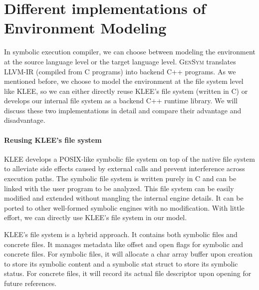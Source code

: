 \documentclass[sigplan, nonacm]{acmart}\settopmatter{printfolios=true,printccs=false,printacmref=false}
\newcommand{\tool}{\textsc{GenSym}\xspace}
\begin{document}
\section{Different implementations of Environment Modeling}\label{twofsimpl}
In symbolic execution compiler, we can choose between modeling the environment at the source language level or the target language level. \tool translates LLVM-IR (compiled from C programs) into backend C++ programs. As we mentioned before, we choose to model the environment at the file system level like KLEE, so we can either directly reuse KLEE's file system (written in C) or develops our internal file system as a backend C++ runtime library. We will discuss these two implementations in detail and compare their advantage and disadvantage.
\paragraph*{Reusing KLEE's file system}
KLEE develops a POSIX-like symbolic file system on top of the native file system to alleviate side effects caused by external calls and prevent interference across execution paths. The symbolic file system is written purely in C and can be linked with the user program to be analyzed. This file system can be easily modified and extended without mangling
 the internal engine details. It can be ported to other well-formed symbolic engines with no modification. With little effort, we can directly use KLEE's file system in our model.\par
 KLEE's file system is a hybrid approach. It contains both symbolic files and concrete files. It manages metadata like offset and open flags for symbolic and concrete files. For symbolic files, it will allocate a char array buffer upon creation to store its symbolic content and a symbolic stat struct to store its symbolic status. For concrete files, it will record its actual file descriptor upon opening for future references.\par
\end{document}
